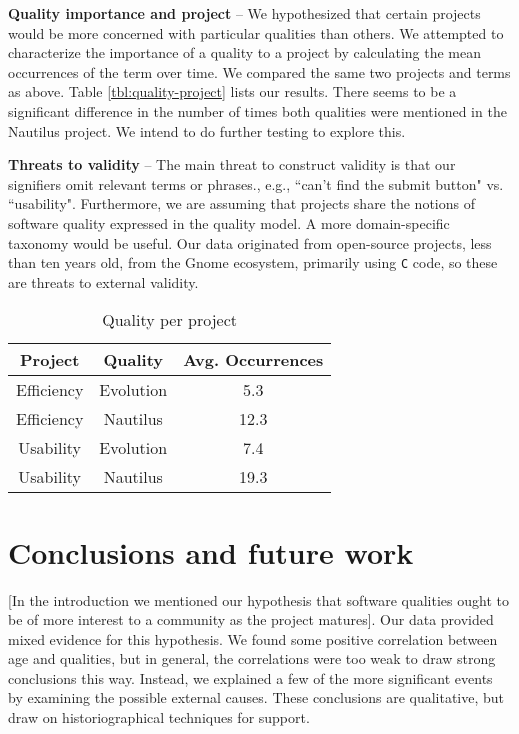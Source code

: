 \documentclass[conference, compsoc]{IEEEtran}
\begin{document}
\noindent\textbf{Quality importance and project} -- We hypothesized that certain projects would be more concerned with particular qualities than others. We attempted to characterize the importance of a quality to a project by calculating the mean occurrences of the term over time. We compared the same two projects and terms as above. Table \ref{tbl:quality-project} lists our results. There seems to be a significant difference in the number of times both qualities were mentioned in the Nautilus project. We intend to do further testing to explore this.

\noindent\textbf{Threats to validity} -- The main threat to construct validity is that our signifiers omit relevant terms or phrases., e.g., ``can't find the submit button" vs. ``usability". Furthermore, we are assuming that projects share the notions of software quality expressed in the quality model. A more domain-specific taxonomy would be useful. Our data originated from open-source projects, less than ten years old, from the Gnome ecosystem, primarily using \texttt{C} code, so these are threats to external validity.

\begin{table}
	\caption{Quality per project}
	\centering
	\label{tbl:windows}
\begin{tabular}{|c|c|c|}
\hline
\rowcolor[gray]{.9} 
Project & Quality & Avg. Occurrences\\ \hline
Efficiency & Evolution & 5.3\\
Efficiency & Nautilus & 12.3\\
Usability & Evolution & 7.4\\
Usability & Nautilus & 19.3\\
\hline
\end{tabular}
\end{table}

\vspace{-2mm}
\section{Conclusions and future work}
\vspace{-2mm}
[In the introduction we mentioned our hypothesis that software qualities ought to be of more interest to a community as the project matures]. Our data provided mixed evidence for this hypothesis. We found some positive correlation between age and qualities, but in general, the correlations were too weak to draw strong conclusions this way. Instead, we explained a few of the more significant events by examining the possible external causes. These conclusions are qualitative, but draw on historiographical techniques for support.
\end{document}
